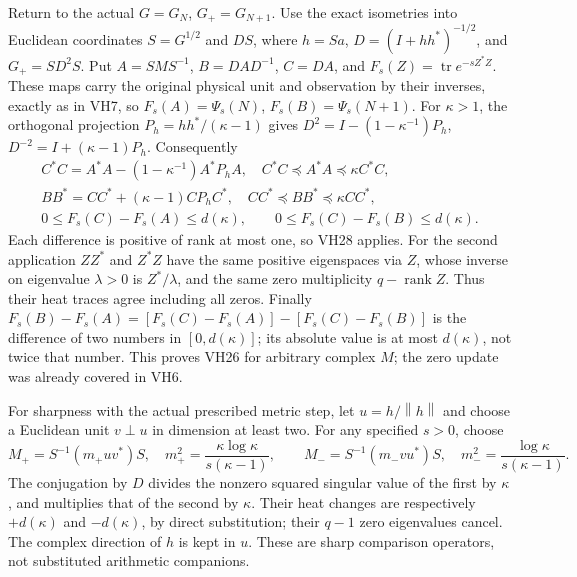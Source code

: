 \documentclass[11pt]{article}
\newcommand{\tr}{\operatorname{tr}}\newcommand{\norm}[1]{\left\lVert#1\right\rVert}
\begin{document}
Return to the actual \(G=G_N\), \(G_+=G_{N+1}\). Use the exact
isometries into Euclidean coordinates
\(S=G^{1/2}\) and \(DS\), where
\(h=Sa\), \(D=(I+hh^*)^{-1/2}\), and
\(G_+=S D^2 S\). Put \(A=SMS^{-1}\), \(B=DAD^{-1}\), \(C=DA\),
and \(F_s(Z)=\tr e^{-sZ^*Z}\). These maps carry the original physical
unit and observation by their inverses, exactly as in VH7, so
\(F_s(A)=\Psi_s(N)\), \(F_s(B)=\Psi_s(N+1)\).
For \(\kappa>1\), the orthogonal projection
\(P_h=hh^*/(\kappa-1)\) gives
\(D^2=I-(1-\kappa^{-1})P_h\), \(D^{-2}=I+(\kappa-1)P_h\).
Consequently
\begin{equation}\tag{VH29}\label{VH29}
\begin{gathered}
C^*C=A^*A-(1-\kappa^{-1})A^*P_hA,\quad
C^*C\preceq A^*A\preceq\kappa C^*C,\\
BB^*=CC^*+(\kappa-1)CP_hC^*,\quad
CC^*\preceq BB^*\preceq\kappa CC^*,\\
0\le F_s(C)-F_s(A)\le d(\kappa),\qquad
0\le F_s(C)-F_s(B)\le d(\kappa).
\end{gathered}
\end{equation}
Each difference is positive of rank at most one, so VH28 applies.
For the second application \(ZZ^*\) and \(Z^*Z\) have the same
positive eigenspaces via \(Z\), whose inverse on eigenvalue \(\lambda>0\)
is \(Z^*/\lambda\), and the same zero multiplicity \(q-\operatorname{rank}Z\).
Thus their heat traces agree including all zeros. Finally
\(F_s(B)-F_s(A)=[F_s(C)-F_s(A)]-[F_s(C)-F_s(B)]\) is the difference
of two numbers in \([0,d(\kappa)]\); its absolute value is at most
\(d(\kappa)\), not twice that number. This proves VH26 for arbitrary
complex \(M\); the zero update was already covered in VH6.

For sharpness with the actual prescribed metric step, let \(u=h/\norm h\)
and choose a Euclidean unit \(v\perp u\) in dimension at least two.
For any specified \(s>0\), choose
\begin{equation}\tag{VH30}\label{VH30}
M_+=S^{-1}(m_+uv^*)S,\quad
m_+^2=\frac{\kappa\log\kappa}{s(\kappa-1)},\qquad
M_-=S^{-1}(m_-vu^*)S,\quad
m_-^2=\frac{\log\kappa}{s(\kappa-1)}.
\end{equation}
The conjugation by \(D\) divides the nonzero squared singular value
of the first by \(\kappa\), and multiplies that of the second by
\(\kappa\). Their heat changes are respectively
\(+d(\kappa)\) and \(-d(\kappa)\), by direct substitution; their
\(q-1\) zero eigenvalues cancel. The complex direction of \(h\) is
kept in \(u\). These are sharp comparison operators, not substituted
arithmetic companions.
\end{document}
